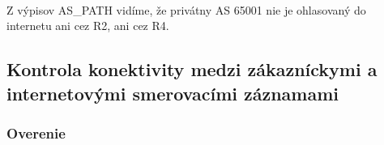 \documentclass[12pt,twoside,a4paper]{report}
\begin{document}
\paragraph{}
Z výpisov AS\_PATH vidíme, že privátny AS 65001 nie je ohlasovaný do internetu ani cez R2, ani cez R4.


\subsection{Kontrola konektivity medzi zákazníckymi a internetovými smerovacími záznamami}
\subsubsection{Overenie}
\paragraph{}
\end{document}
